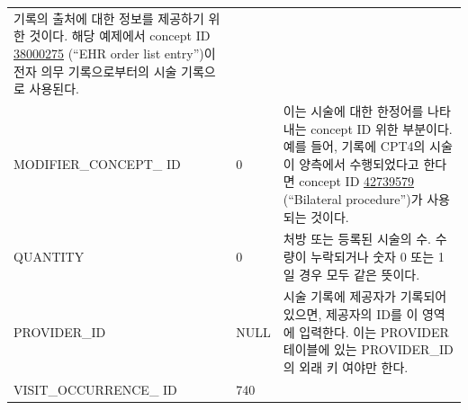 \documentclass[10.5pt]{book}
\theoremstyle{definition}
\theoremstyle{definition}
\theoremstyle{definition}
\theoremstyle{remark}
\begin{document}
\begin{longtable}[]{@{}lll@{}}
\begin{minipage}[t]{0.48\columnwidth}
기록의 출처에 대한 정보를 제공하기 위한 것이다. 해당 예제에서 concept ID
\href{http://athena.ohdsi.org/search-terms/terms/38000275}{38000275}
(``EHR order list entry'')이 전자 의무 기록으로부터의 시술 기록으로
사용된다.\strut
\end{minipage}\tabularnewline
\begin{minipage}[t]{0.28\columnwidth}\raggedright\strut
MODIFIER\_CONCEPT\_ ID\strut
\end{minipage} & \begin{minipage}[t]{0.16\columnwidth}\raggedright\strut
0\strut
\end{minipage} & \begin{minipage}[t]{0.48\columnwidth}\raggedright\strut
이는 시술에 대한 한정어를 나타내는 concept ID 위한 부분이다. 예를 들어,
기록에 CPT4의 시술이 양측에서 수행되었다고 한다면 concept ID
\href{http://athena.ohdsi.org/search-terms/terms/42739579}{42739579}
(``Bilateral procedure'')가 사용되는 것이다.\strut
\end{minipage}\tabularnewline
\begin{minipage}[t]{0.28\columnwidth}\raggedright\strut
QUANTITY\strut
\end{minipage} & \begin{minipage}[t]{0.16\columnwidth}\raggedright\strut
0\strut
\end{minipage} & \begin{minipage}[t]{0.48\columnwidth}\raggedright\strut
처방 또는 등록된 시술의 수. 수량이 누락되거나 숫자 0 또는 1일 경우 모두
같은 뜻이다.\strut
\end{minipage}\tabularnewline
\begin{minipage}[t]{0.28\columnwidth}\raggedright\strut
PROVIDER\_ID\strut
\end{minipage} & \begin{minipage}[t]{0.16\columnwidth}\raggedright\strut
NULL\strut
\end{minipage} & \begin{minipage}[t]{0.48\columnwidth}\raggedright\strut
시술 기록에 제공자가 기록되어 있으면, 제공자의 ID를 이 영역에 입력한다.
이는 PROVIDER 테이블에 있는 PROVIDER\_ID의 외래 키 여야만 한다.\strut
\end{minipage}\tabularnewline
\begin{minipage}[t]{0.28\columnwidth}\raggedright\strut
VISIT\_OCCURRENCE\_ ID\strut
\end{minipage} & \begin{minipage}[t]{0.16\columnwidth}\raggedright\strut
740\strut
\end{minipage} & \begin{minipage}[t]{0.48\columnwidth}\raggedright\strut

\end{minipage}
\end{longtable}
\end{document}

